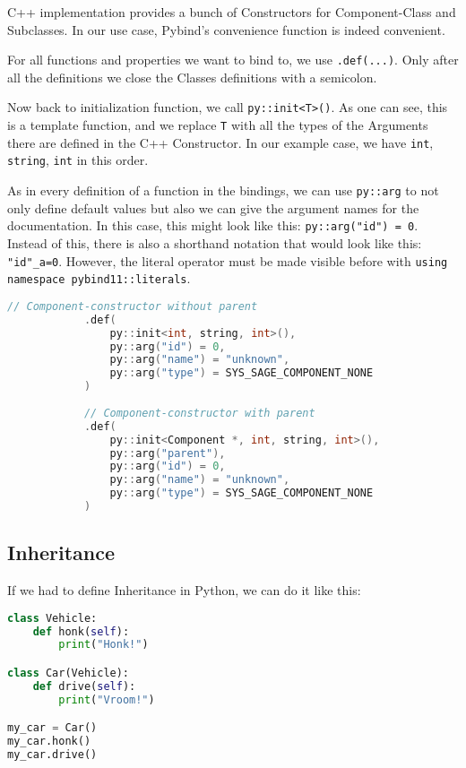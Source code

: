 C++ implementation provides a bunch of Constructors for Component-Class and Subclasses. In our use case, Pybind's convenience function is indeed convenient.

For all functions and properties we want to bind to, we use \verb|.def(...)|. Only after all the definitions we close the Classes definitions with a semicolon.

Now back to initialization function, we call \verb|py::init<T>()|. As one can see, this is a template function, and we replace \verb|T| with all the types of the Arguments there are defined in the C++ Constructor. In our example case, we have \verb|int|, \verb|string|, \verb|int| in this order.

As in every definition of a function in the bindings, we can use \verb|py::arg| to not only define default values but also we can give the argument names for the documentation. In this case, this might look like this: \verb|py::arg("id") = 0|. Instead of this, there is also a shorthand notation that would look like this: \verb|"id"_a=0|. However, the literal operator must be made visible before with \verb|using namespace pybind11::literals|.
\begin{lstlisting}[language=C++, xleftmargin=4em]
            // Component-constructor without parent
            .def(
                py::init<int, string, int>(),
                py::arg("id") = 0,
                py::arg("name") = "unknown",
                py::arg("type") = SYS_SAGE_COMPONENT_NONE
            )
            
            // Component-constructor with parent
            .def(
                py::init<Component *, int, string, int>(),
                py::arg("parent"),
                py::arg("id") = 0,
                py::arg("name") = "unknown",
                py::arg("type") = SYS_SAGE_COMPONENT_NONE
            )
\end{lstlisting}
\subsection{Inheritance}

If we had to define Inheritance in Python, we can do it like this:
\newpage
\begin{lstlisting}[language=Python, xleftmargin=4em]
class Vehicle:
    def honk(self):
        print("Honk!")

class Car(Vehicle):
    def drive(self):
        print("Vroom!")

my_car = Car()
my_car.honk()
my_car.drive()
\end{lstlisting}

